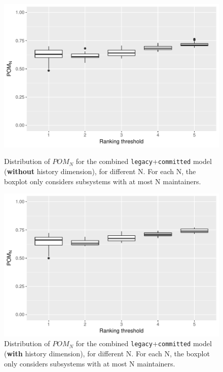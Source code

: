 \begin{figure}[t]
  \centering
  \begin{minipage}[b]{\columnwidth}
    \centering
    \includegraphics[scale=.6]{plots/RQ3_curr_many}
    \caption{Distribution of $POM_N$ for the combined \texttt{legacy}+\texttt{committed} model (\textbf{without} history dimension), for different N. For each N, the boxplot only considers subsystems with at most N maintainers.}
    \label{fig:rq3_curr_many}
  \end{minipage}
  \begin{minipage}[b]{\columnwidth}
    \centering
    \includegraphics[scale=.6]{plots/RQ3_hist_many}
    \caption{Distribution of $POM_N$ for the combined \texttt{legacy}+\texttt{committed} model (\textbf{with} history dimension), for different N. For each N, the boxplot only considers subsystems with at most N maintainers.}
    \label{fig:rq3_hist_many}
  \end{minipage}
\end{figure}



